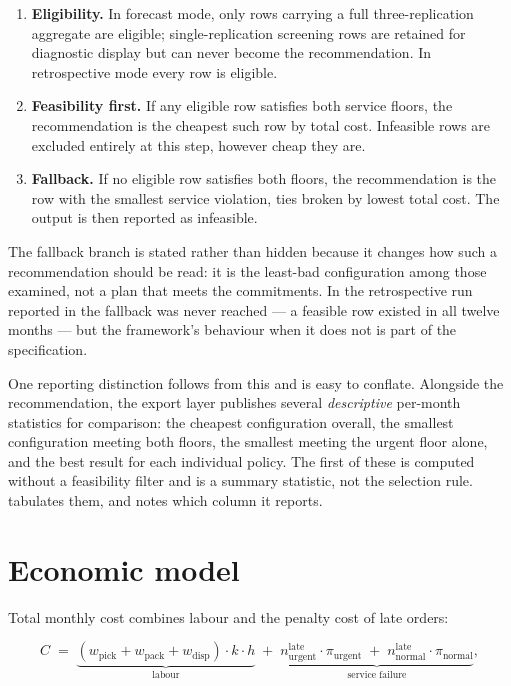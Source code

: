 \begin{enumerate}
  \item \textbf{Eligibility.} In forecast mode, only rows carrying a full three-replication
        aggregate are eligible; single-replication screening rows are retained for diagnostic
        display but can never become the recommendation. In retrospective mode every row is
        eligible.
  \item \textbf{Feasibility first.} If any eligible row satisfies both service floors, the
        recommendation is the cheapest such row by total cost. Infeasible rows are excluded
        entirely at this step, however cheap they are.
  \item \textbf{Fallback.} If no eligible row satisfies both floors, the recommendation is the
        row with the smallest service violation, ties broken by lowest total cost. The output is
        then reported as infeasible.
\end{enumerate}

The fallback branch is stated rather than hidden because it changes how such a recommendation
should be read: it is the least-bad configuration among those examined, not a plan that meets
the commitments. In the retrospective run reported in  the fallback was never
reached --- a feasible row existed in all twelve months --- but the framework's behaviour when
it does not is part of the specification.

One reporting distinction follows from this and is easy to conflate. Alongside the
recommendation, the export layer publishes several \emph{descriptive} per-month statistics for
comparison: the cheapest configuration overall, the smallest configuration meeting both floors,
the smallest meeting the urgent floor alone, and the best result for each individual policy. The
first of these is computed without a feasibility filter and is a summary statistic, not the
selection rule.  tabulates them, and  notes which
column it reports.

\section{Economic model}
\label{sec:economics}

Total monthly cost combines labour and the penalty cost of late orders:

\begin{equation}
C \;=\; \underbrace{\left(w_{\text{pick}} + w_{\text{pack}} + w_{\text{disp}}\right) \cdot k \cdot h}_{\text{labour}}
\;+\; \underbrace{n^{\text{late}}_{\text{urgent}} \cdot \pi_{\text{urgent}}
\;+\; n^{\text{late}}_{\text{normal}} \cdot \pi_{\text{normal}}}_{\text{service failure}},
\label{eq:cost}
\end{equation}

